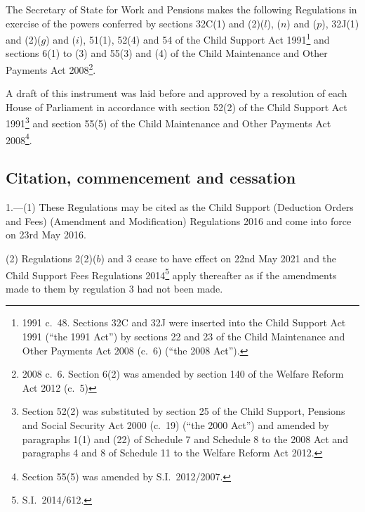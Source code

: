 \documentclass[12pt,a4paper]{article}
\title{\regstitle}
\author{S.I.\ 2016 No.\ 439}
\date{Made
23rd March 2016\\
Coming into force
23rd May 2016
}
\begin{document}
\maketitle


\noindent
The Secretary of State for Work and Pensions makes the following Regulations in exercise of the powers conferred by sections 32C(1) and (2)($l$), ($n$) and ($p$), 32J(1) and (2)($g$) and ($i$), 51(1), 52(4) and 54 of the Child Support Act 1991\footnote{1991 c.~48. Sections 32C and 32J were inserted into the Child Support Act 1991 (“the 1991 Act”) by sections 22 and 23 of the Child Maintenance and Other Payments Act 2008 (c.~6) (“the 2008 Act”).} and sections 6(1) to (3) and 55(3) and (4) of the Child Maintenance and Other Payments Act 2008\footnote{2008 c.~6. Section 6(2) was amended by section 140 of the Welfare Reform Act 2012 (c.~5)}.

A draft of this instrument was laid before and approved by a resolution of each House of Parliament in accordance with section 52(2) of the Child Support Act 1991\footnote{Section 52(2) was substituted by section 25 of the Child Support, Pensions and Social Security Act 2000 (c.~19) (“the 2000 Act”) and amended by paragraphs 1(1) and (22) of Schedule 7 and Schedule 8 to the 2008 Act and paragraphs 4 and 8 of Schedule 11 to the Welfare Reform Act 2012.} and section 55(5) of the Child Maintenance and Other Payments Act 2008\footnote{Section 55(5) was amended by S.I.~2012/2007.}. 

{\sloppy

\tableofcontents

}

\bigskip

\setcounter{secnumdepth}{-2}

\subsection[1. Citation, commencement and cessation]{Citation, commencement and cessation}

1.---(1) These Regulations may be cited as the Child Support (Deduction Orders and Fees) (Amendment and Modification) Regulations 2016 and come into force on 23rd May 2016.

(2)
Regulations 2(2)($b$) and 3 cease to have effect on 22nd May 2021 and the Child Support Fees Regulations 2014\footnote{S.I.~2014/612.} apply thereafter as if the amendments made to them by regulation 3 had not been made.
\end{document}
